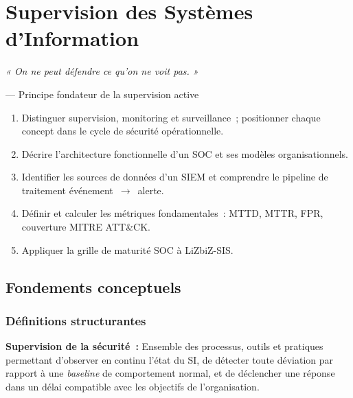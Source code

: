\chapter{Supervision des Systèmes d'Information}
\label{chap:supervision}

\epigraph{\itshape « On ne peut défendre ce qu'on ne voit pas. »}
         {--- Principe fondateur de la supervision active}

\begin{boxobjectifs}
\begin{enumerate}
  \item Distinguer supervision, monitoring et surveillance~; positionner chaque
        concept dans le cycle de sécurité opérationnelle.
  \item Décrire l'architecture fonctionnelle d'un SOC et ses modèles
        organisationnels.
  \item Identifier les sources de données d'un SIEM et comprendre le pipeline
        de traitement événement~$\to$~alerte.
  \item Définir et calculer les métriques fondamentales~: MTTD, MTTR, FPR,
        couverture MITRE ATT\&CK.
  \item Appliquer la grille de maturité SOC à LiZbiZ-SIS.
\end{enumerate}
\end{boxobjectifs}

\section{Fondements conceptuels}
\label{sec:superv-fondements}

\subsection{Définitions structurantes}

\begin{boxdef}
\textbf{Supervision de la sécurité~:} Ensemble des processus, outils et pratiques
permettant d'observer en continu l'état du SI, de détecter toute déviation par
rapport à une \textit{baseline} de comportement normal, et de déclencher une réponse
dans un délai compatible avec les objectifs de l'organisation.
\end{boxdef}

